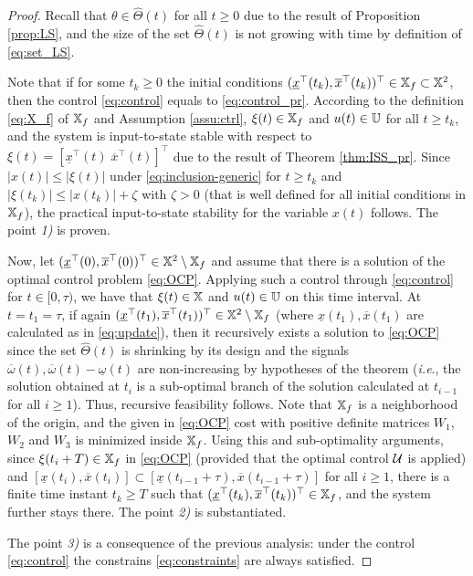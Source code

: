 \documentclass[letterpaper, 10 pt, conference]{ieeeconf}  %
\begin{document}
\begin{proof}
Recall that $\theta\in\hat{\Theta}(t)$ for all $t\geq0$ due to the
result of Proposition \ref{prop:LS}, and the size of the set $\hat{\Theta}(t)$
is not growing with time by definition of \eqref{eq:set_LS}.

Note that if for some $t_{k}\geq0$ the initial conditions $(\underline{x}^{\top}(t_{k}),\overline{x}^{\top}(t_{k}))^{\top}\in\mathbb{X}_{f}\subset\mathbb{X}^{2}$,
then the control \eqref{eq:control} equals to \eqref{eq:control_pr}.
According to the definition \eqref{eq:X_f} of $\mathbb{X}_{f}$ and Assumption
\ref{assu:ctrl}, $\xi(t)\in\mathbb{X}_{f}$ and $u(t)\in\mathbb{U}$ for all $t\geq t_{k}$,
and the system is input-to-state stable with respect to $\xi(t)=[\underline{x}^{\top}(t)\;\overline{x}^{\top}(t)]^{\top}$
due to the result of Theorem \ref{thm:ISS_pr}. Since $|x(t)|\leq|\xi(t)|$
under \eqref{eq:inclusion-generic} for $t\geq t_{k}$ and $|\xi(t_{k})|\leq|x(t_{k})|+\zeta$
with $\zeta>0$ (that is well defined for all initial conditions in
$\mathbb{X}_{f}$), the practical input-to-state stability for the variable
$x(t)$ follows. The point \emph{1)} is proven.

Now, let $(\underline{x}^{\top}(0),\overline{x}^{\top}(0))^{\top}\in\mathbb{X}^{2}\setminus\mathbb{X}_{f}$
and assume that there is a solution of the optimal control problem
\eqref{eq:OCP}. Applying such a control through \eqref{eq:control}
for $t\in[0,\tau)$, we have that $\xi(t)\in\mathbb{X}$ and $u(t)\in\mathbb{U}$
on this time interval. At $t=t_{1}=\tau$, if again $(\underline{x}^{\top}(t_{1}),\overline{x}^{\top}(t_{1}))^{\top}\in\mathbb{X}^{2}\setminus\mathbb{X}_{f}$
(where $\underline{x}(t_{1}),\overline{x}(t_{1})$ are calculated
as in \eqref{eq:update}), then it recursively exists a solution to
\eqref{eq:OCP} since the set $\hat{\Theta}(t)$ is shrinking by its
design and the signals $\overline{\omega}(t),\overline{\omega}(t)-\underline{\omega}(t)$
are non-increasing by hypotheses of the theorem (\emph{i.e}., the
solution obtained at $t_{i}$ is a sub-optimal branch of the solution
calculated at $t_{i-1}$ for all $i\geq1$). Thus, recursive feasibility
follows. Note that $\mathbb{X}_{f}$ is a neighborhood of the origin, and
the given in \eqref{eq:OCP} cost with positive definite matrices
$W_{1}$, $W_{2}$ and $W_{3}$ is minimized inside $\mathbb{X}_{f}$. Using
this and sub-optimality arguments, since $\xi(t_{i}+T)\in\mathbb{X}_{f}$
in \eqref{eq:OCP} (provided that the optimal control $\mathcal{U}$ is applied)
and $[\underline{x}(t_{i}),\overline{x}(t_{i})]\subset[\underline{x}(t_{i-1}+\tau),\overline{x}(t_{i-1}+\tau)]$
for all $i\geq1$, there is a finite time instant $t_{k}\geq T$ such
that $(\underline{x}^{\top}(t_{k}),\overline{x}^{\top}(t_{k}))^{\top}\in\mathbb{X}_{f}$,
and the system further stays there. The point \emph{2)} is substantiated.

The point \emph{3)} is a consequence of the previous analysis: under
the control \eqref{eq:control} the constrains \eqref{eq:constraints}
are always satisfied.
\end{proof}
\end{document}
